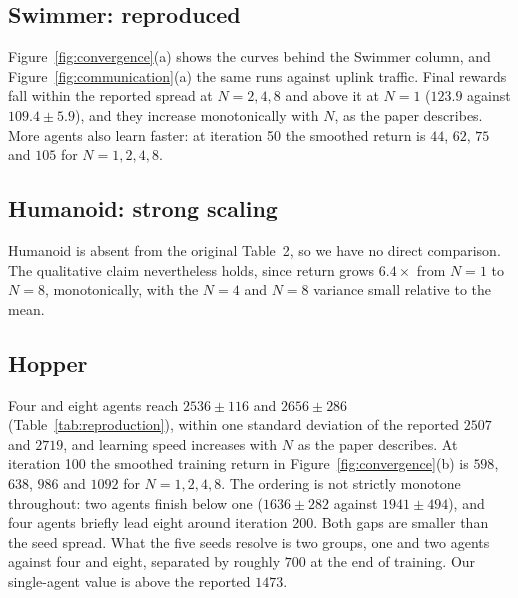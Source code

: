 \subsection{Swimmer: reproduced}

Figure~\ref{fig:convergence}(a) shows the curves behind the Swimmer column, and
Figure~\ref{fig:communication}(a) the same runs against uplink traffic. Final
rewards fall within the reported spread at $N = 2, 4, 8$ and above it at
$N=1$ ($123.9$ against $109.4 \pm 5.9$), and they increase monotonically with
$N$, as the paper describes. More agents also learn faster: at iteration 50
the smoothed return is $44$, $62$, $75$ and $105$ for $N = 1, 2, 4, 8$.

\subsection{Humanoid: strong scaling}
\label{sec:humanoid}

Humanoid is absent from the original Table~2, so we have no direct comparison.
The qualitative claim nevertheless holds, since return grows $6.4\times$ from $N=1$ to $N=8$,
monotonically, with the $N=4$ and $N=8$ variance small relative to the mean.

\subsection{Hopper}
\label{sec:hopper}

Four and eight agents reach $2536 \pm 116$ and $2656 \pm 286$
(Table~\ref{tab:reproduction}), within one standard deviation of the reported
$2507$ and $2719$, and learning speed increases with $N$ as the paper
describes. At iteration 100 the smoothed training return in
Figure~\ref{fig:convergence}(b) is $598$, $638$, $986$ and $1092$ for
$N = 1, 2, 4, 8$. The ordering is not strictly monotone throughout: two agents
finish below one ($1636 \pm 282$ against $1941 \pm 494$), and four agents
briefly lead eight around iteration 200. Both gaps are smaller than the seed
spread. What the five seeds resolve is two groups, one and two agents against
four and eight, separated by roughly $700$ at the end of training. Our
single-agent value is above the reported $1473$.
